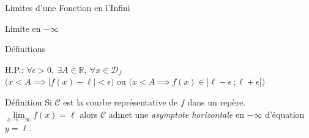 \documentclass{coursbook}
\begin{document}
\begin{Gpartie}{Limites d'une Fonction en l'Infini}
\begin{Spartie}{Limite en $-\infty$}
\begin{SSpartie}{Définitions}
\begin{itemize}
\begin{center}
                        \parbox{\linewidth}{}
                    \end{center}
                    H.P.: $\forall\epsilon >0,~\exists A\in\mathbb{R},~\forall x\in\mathcal{D}_f$ \\ \phantom{H.P.: }$\bigg(x<A\implies\left\lvert f(x)-\ell\right\rvert <\epsilon\bigg)$ ou $\bigg(x<A\implies f(x)\in\big]\ell-\epsilon~;\ell+\epsilon\big[\bigg)$
                \end{itemize}
            \end{SSpartie}
            \begin{SSpartie}{Définition} 
                Si $\mathcal{C}$ est la courbe représentative de $f$ dans un repère. $\lim\limits_{x\to-\infty}f(x)=\ell$ alors $\mathcal{C}$ admet une \emph{asymptote horizontale} en $-\infty$ d'équation $y=\ell$.
            \end{SSpartie}
        \end{Spartie}
    \end{Gpartie}
    \pagebreak
\end{document}
